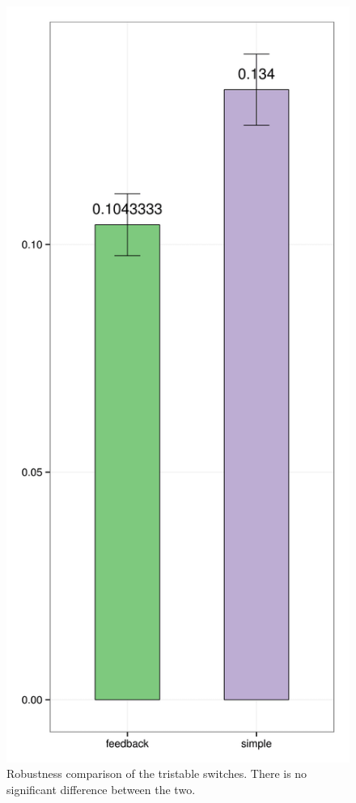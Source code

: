 \begin{figure}[h!]
\begin{center}
\includegraphics[scale=0.1]{chapterStabilityFinder/mass_action_switches/bi_tri_same_priors/robustness_comparison_tri.png}
\caption{Robustness comparison of the tristable switches. There is no significant difference between the two.}\label{fig_4}
\end{center}
\end{figure}
\clearpage

